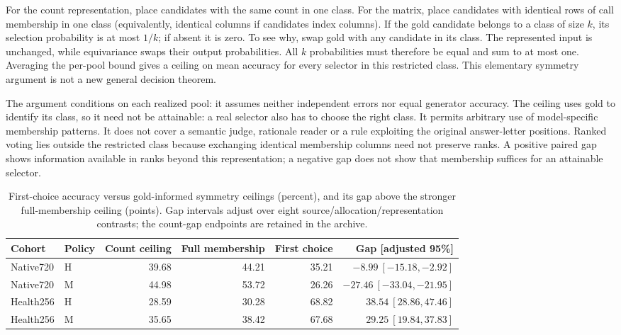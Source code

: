 For the count representation, place candidates with the same count in one class. For the matrix, place candidates with identical rows of call membership in one class (equivalently, identical columns if candidates index columns). If the gold candidate belongs to a class of size $k$, its selection probability is at most $1/k$; if absent it is zero. To see why, swap gold with any candidate in its class. The represented input is unchanged, while equivariance swaps their output probabilities. All $k$ probabilities must therefore be equal and sum to at most one. Averaging the per-pool bound gives a ceiling on mean accuracy for every selector in this restricted class. This elementary symmetry argument is not a new general decision theorem.

The argument conditions on each realized pool: it assumes neither independent errors nor equal generator accuracy. The ceiling uses gold to identify its class, so it need not be attainable: a real selector also has to choose the right class. It permits arbitrary use of model-specific membership patterns. It does not cover a semantic judge, rationale reader or a rule exploiting the original answer-letter positions. Ranked voting lies outside the restricted class because exchanging identical membership columns need not preserve ranks. A positive paired gap shows information available in ranks beyond this representation; a negative gap does not show that membership suffices for an attainable selector.

\begin{table}[ht]
\centering\small
\caption{First-choice accuracy versus gold-informed symmetry ceilings (percent), and its gap above the stronger full-membership ceiling (points). Gap intervals adjust over eight source/allocation/representation contrasts; the count-gap endpoints are retained in the archive.}
\begin{tabular}{llrrrr}
\toprule
Cohort & Policy & Count ceiling & Full membership & First choice & Gap [adjusted 95\%]\\
\midrule
Native720 & H & 39.68 & 44.21 & 35.21 & $-8.99\ [-15.18,-2.92]$\\
Native720 & M & 44.98 & 53.72 & 26.26 & $-27.46\ [-33.04,-21.95]$\\
Health256 & H & 28.59 & 30.28 & 68.82 & $38.54\ [28.86,47.46]$\\
Health256 & M & 35.65 & 38.42 & 67.68 & $29.25\ [19.84,37.83]$\\
\bottomrule
\end{tabular}
\end{table}

